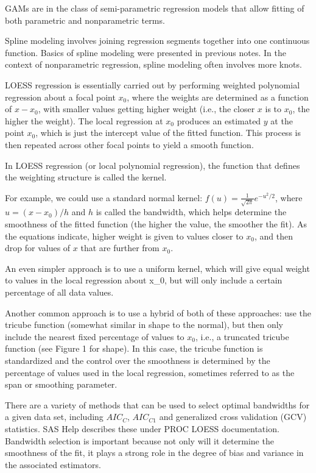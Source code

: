 \documentclass[
  9pt,
  ignorenonframetext,
]{beamer}
\begin{document}
\begin{frame}{}
\protect\hypertarget{section}{}
GAMs are in the class of semi-parametric regression models that allow
fitting of both parametric and nonparametric terms.

Spline modeling involves joining regression segments together into one
continuous function. Basics of spline modeling were presented in
previous notes. In the context of nonparametric regression, spline
modeling often involves more knots.

LOESS regression is essentially carried out by performing weighted
polynomial regression about a focal point \(x_0\), where the weights are
determined as a function of \(x-x_0\), with smaller values getting
higher weight (i.e., the closer \(x\) is to \(x_0\), the higher the
weight). The local regression at \(x_0\) produces an estimated \(y\) at
the point \(x_0\), which is just the intercept value of the fitted
function. This process is then repeated across other focal points to
yield a smooth function.
\end{frame}

\begin{frame}{}
\protect\hypertarget{section-1}{}
In LOESS regression (or local polynomial regression), the function that
defines the weighting structure is called the kernel.

For example, we could use a standard normal kernel:
\(f(u)=\frac 1 {\sqrt {2\pi}} e^{-u^2 /2}\), where \(u=(x-x_0)/h\) and
\(h\) is called the bandwidth, which helps determine the smoothness of
the fitted function (the higher the value, the smoother the fit). As the
equations indicate, higher weight is given to values closer to \(x_0\),
and then drop for values of \(x\) that are further from \(x_0\).

An even simpler approach is to use a uniform kernel, which will give
equal weight to values in the local regression about x\_0, but will only
include a certain percentage of all data values.
\end{frame}

\begin{frame}{}
\protect\hypertarget{section-2}{}
Another common approach is to use a hybrid of both of these approaches:
use the tricube function (somewhat similar in shape to the normal), but
then only include the nearest fixed percentage of values to \(x_0\),
i.e., a truncated tricube function (see Figure 1 for shape). In this
case, the tricube function is standardized and the control over the
smoothness is determined by the percentage of values used in the local
regression, sometimes referred to as the span or smoothing parameter.

There are a variety of methods that can be used to select optimal
bandwidths for a given data set, including \(AIC_C\), \(AIC_{C1}\) and
generalized cross validation (GCV) statistics. SAS Help describes these
under PROC LOESS documentation. Bandwidth selection is important because
not only will it determine the smoothness of the fit, it plays a strong
role in the degree of bias and variance in the associated estimators.
\end{frame}
\end{document}
